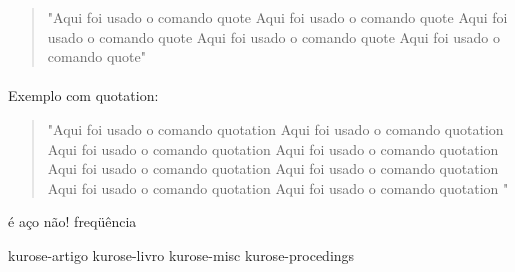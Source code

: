 \documentclass[12pt, a4paper]{article}
\begin{document}
\begin{quote}
"Aqui foi usado o comando quote Aqui foi usado o comando quote Aqui foi usado o comando quote Aqui foi usado o comando quote Aqui foi usado o comando quote"
\end{quote} 

\paragraph{}
Exemplo com quotation:

\begin{quotation}
"Aqui foi usado o comando quotation Aqui foi usado o comando quotation Aqui foi usado o comando quotation Aqui foi usado o comando quotation Aqui foi usado o comando quotation Aqui foi usado o comando quotation Aqui foi usado o comando quotation Aqui foi usado o comando quotation "
\end{quotation} 

\newpage
é aço não! freqüência

kurose-artigo \cite{kurose-artigo}
kurose-livro \cite{kurose-livro}
kurose-misc \cite{kurose-site}
kurose-procedings \cite{kurose-inprocedings}





\end{document}
